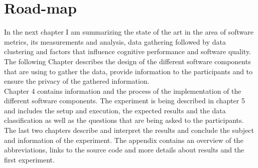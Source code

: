 \section{Road-map}
In the next chapter I am summarizing the state of the art in the area of software metrics, its measurements and analysis, data gathering followed by data clustering and factors that influence cognitive performance and software quality.\\
The following Chapter describes the design of the different software components that are using to gather the data, provide information to the participants and to ensure the privacy of the gathered information.\\
Chapter 4 contains information and the process of the implementation of the different software components. 
The experiment is being described in chapter 5 and includes the setup and execution, the expected results and the data classification as well as the questions that are being asked to the participants. \\
The last two chapters describe and interpret the results and conclude the subject and information of the experiment.
The appendix contains an overview of the abbreviations, links to the source code and more details about results and the first experiment.

